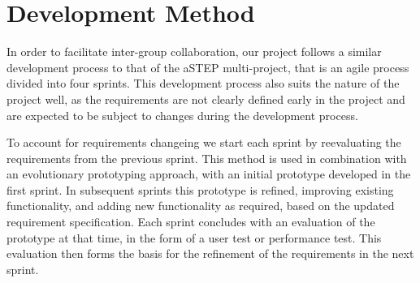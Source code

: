 \section{Development Method} \label{sec:dev_method}
In order to facilitate inter-group collaboration, our project follows a similar development process to that of the aSTEP multi-project, that is an agile process divided into four sprints. This development process also suits the nature of the project well, as the requirements are not clearly defined early in the project and are expected to be subject to changes during the development process.

To account for requirements changeing we start each sprint by reevaluating the requirements from the previous sprint. This method is used in combination with an evolutionary prototyping approach, with an initial prototype developed in the first sprint. In subsequent sprints this prototype is refined, improving existing functionality, and adding new functionality as required, based on the updated requirement specification. Each sprint concludes with an evaluation of the prototype at that time, in the form of a user test or performance test. This evaluation then forms the basis for the refinement of the requirements in the next sprint. 

